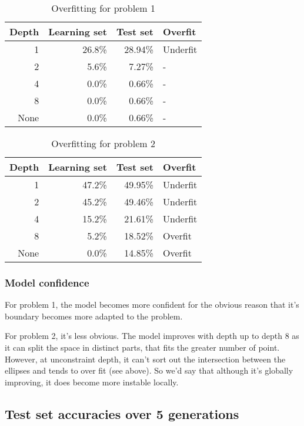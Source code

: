 \documentclass{article}
\begin{document}
\begin{table}[h]
  \centering
	\begin{tabular}{rrrl}
	      \textbf{Depth} & \textbf{Learning set} & \textbf{Test set} & \textbf{Overfit} \\
	      \hline
	      1 & 26.8\% & 28.94\% & Underfit \\
2 & 5.6\% & 7.27\% & - \\
4 & 0.0\% & 0.66\% & - \\
8 & 0.0\% & 0.66\% & - \\
None & 0.0\% & 0.66\% & - \\
	\end{tabular}
  \caption{\label{overfitting1}Overfitting for problem 1}
\end{table}

\begin{table}[h]
  \centering
	\begin{tabular}{rrrl}
	      \textbf{Depth} & \textbf{Learning set} & \textbf{Test set} & \textbf{Overfit} \\
	      \hline
    1 & 47.2\% & 49.95\% & Underfit \\
2 & 45.2\% & 49.46\% & Underfit \\
4 & 15.2\% & 21.61\% & Underfit \\
8 & 5.2\% & 18.52\% & Overfit \\
None & 0.0\% & 14.85\% & Overfit \\

	\end{tabular}
  \caption{\label{overfitting2}Overfitting for problem 2}
\end{table}


\subsubsection{Model confidence}

For problem 1, the model becomes more confident for the obvious reason that it's boundary becomes more adapted to the problem.

For problem 2, it's less obvious. The model improves with depth up to depth 8 as it can split the space in distinct parts, that fits the greater number of point. However, at unconstraint depth, it can't sort out the intersection between the ellipses and tends to over fit (see above). So we'd say that although it's globally improving, it does become more instable locally.



\subsection{Test set accuracies over 5 generations}
\end{document}
